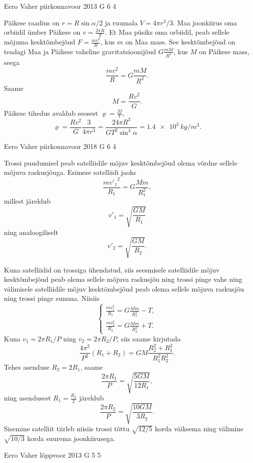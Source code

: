 \documentclass[11pt]{article}
\begin{document}
{%
{Eero Vaher} %
{piirkonnavoor} %
{2013} %
{G 6} %
{4} %
{

\ifSolution
Päikese raadius on $r=R\sin\alpha/2$ ja ruumala $V=4\pi r^3/3$.
Maa joonkiirus oma orbiidil ümber Päikese on $v=\frac{2\pi R}{T}$. Et Maa püsiks oma orbiidil, peab sellele mõjuma kesktõmbejõud $F=\frac{mv^2}{R}$, kus $m$ on Maa mass. See kesktõmbejõud on teadagi Maa ja Päikese vaheline gravitatsioonijõud $G\frac{mM}{R^2}$, kus $M$ on Päikese mass, seega
\[
\frac{mv^2}{R}=G\frac{mM}{R^2}.
\]
Saame
\[
M=\frac{Rv^2}{G}.
\]
Päikese tihedus avaldub seosest $\varrho=\frac{M}{V}$, $$\varrho=\frac{Rv^2}{G} \frac{3}{4\pi r^3}=\frac{24 \pi R^3}{G T^2 \sin^3 \alpha}=\SI{1,4e3}{kg/m^3}.$$
\fi
}

{Eero Vaher} %
{piirkonnavoor} %
{2018} %
{G 6} %
{4} %
{

\ifSolution
Trossi puudumisel peab satelliidile mõjuv kesktõmbejõud olema võrdne sellele mõjuva raskusjõuga. Esimese satelliidi jaoks
\[
\frac{{mv'_1}^2}{R_1}=G\frac{Mm}{R_1^2},
\]
millest järeldub
\[
v'_1=\sqrt{\frac{GM}{R_1}}
\]
ning analoogiliselt
\[
v'_2=\sqrt{\frac{GM}{R_2}}.
\]

Kuna satelliidid on trossiga ühendatud, siis seesmisele satelliidile mõjuv kesktõmbejõud peab olema sellele mõjuva raskusjõu ning trossi pinge vahe ning välimisele satelliidile mõjuv kesktõmbejõud peab olema sellele mõjuva raskusjõu ning trossi pinge summa. Niisiis
$$\begin{cases}
\frac{mv_1^2}{R_1}=G\frac{Mm}{R_1^2}-T,\\
\frac{mv_2^2}{R_2}=G\frac{Mm}{R_2^2}+T.
\end{cases}$$ 
Kuna $v_1=2\pi R_1/P$ ning $v_2=2\pi R_2/P$, siis saame kirjutada
$$\frac{4\pi^2}{P^2}\left(R_1+R_2\right)=GM\frac{R_2^2+R_1^2}{R_1^2R_2^2}.$$
Tehes asenduse $R_2=2R_1$, saame
\[
\frac{2\pi R_1}{P}=\sqrt{\frac{5GM}{12R_1}},
\]
ning asendusest $R_1=\frac{R_2}{2}$ järeldub
\[
\frac{2\pi R_2}{P}=\sqrt{\frac{10GM}{3R_2}}.
\]
Sisemine satelliit tiirleb niisiis trossi tõttu $\sqrt{12/5}$ korda väiksema ning välimine $\sqrt{10/3}$ korda suurema joonkiirusega.
\fi
}

{Eero Vaher} %
{lõppvoor} %
{2013} %
{G 5} %
{5} %
{

}}
\end{document}
